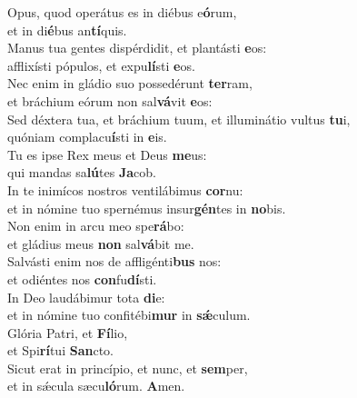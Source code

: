 \evenverse Opus, quod operátus es in diébus e\textbf{ó}rum,~\*\\
\evenverse et in di\textbf{é}bus an\textbf{tí}quis.\\
\oddverse Manus tua gentes dispérdidit, et plantásti \textbf{e}os:~\*\\
\oddverse afflixísti pópulos, et expu\textbf{lí}sti \textbf{e}os.\\
\evenverse Nec enim in gládio suo possedérunt \textbf{ter}ram,~\*\\
\evenverse et bráchium eórum non sal\textbf{vá}vit \textbf{e}os:\\
\oddverse Sed déxtera tua, et bráchium tuum, et illuminátio vultus \textbf{tu}i,~\*\\
\oddverse quóniam complacu\textbf{í}sti in \textbf{e}is.\\
\evenverse Tu es ipse Rex meus et Deus \textbf{me}us:~\*\\
\evenverse qui mandas sa\textbf{lú}tes \textbf{Ja}cob.\\
\oddverse In te inimícos nostros ventilábimus \textbf{cor}nu:~\*\\
\oddverse et in nómine tuo spernémus insur\textbf{gén}tes in \textbf{no}bis.\\
\evenverse Non enim in arcu meo spe\textbf{rá}bo:~\*\\
\evenverse et gládius meus \textbf{non} sal\textbf{vá}bit me.\\
\oddverse Salvásti enim nos de affligénti\textbf{bus} nos:~\*\\
\oddverse et odiéntes nos \textbf{con}fu\textbf{dí}sti.\\
\evenverse In Deo laudábimur tota \textbf{di}e:~\*\\
\evenverse et in nómine tuo confitébi\textbf{mur} in \textbf{sǽ}culum.\\
\oddverse Glória Patri, et \textbf{Fí}lio,~\*\\
\oddverse et Spi\textbf{rí}tui \textbf{San}cto.\\
\evenverse Sicut erat in princípio, et nunc, et \textbf{sem}per,~\*\\
\evenverse et in sǽcula sæcu\textbf{ló}rum. \textbf{A}men.\\
